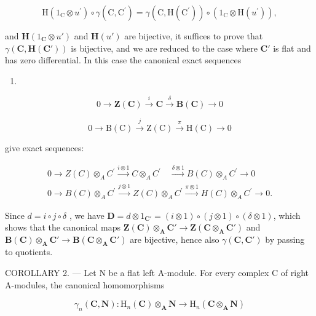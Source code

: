 \[
\mathrm{H} \left(1 _ {\mathrm{C}} \otimes u ^ {\prime}\right) \circ \gamma (\mathrm{C}, \mathrm{C} ^ {\prime}) = \gamma (\mathrm{C}, \mathrm{H} (\mathrm{C} ^ {\prime})) \circ \left(1 _ {\mathrm{C}} \otimes \mathrm{H} (u ^ {\prime})\right),
\]

and \(\mathbf{H}(1_{\mathbf{C}} \otimes u')\) and \(\mathbf{H}(u')\) are bijective, it suffices to prove that \(\gamma(\mathbf{C}, \mathbf{H}(\mathbf{C}'))\) is bijective, and we are reduced to the case where \(\mathbf{C}'\) is flat and has zero differential. In this case the canonical exact sequences

\begin{enumerate}
\def\labelenumi{(\Roman{enumi})}
\tightlist
\item
\end{enumerate}

\[
0 \to \mathbf {Z} (\mathbf {C}) \xrightarrow {i} \mathbf {C} \xrightarrow {\delta} \mathbf {B} (\mathbf {C}) \to 0\tag{II}
\]

\[
0 \rightarrow \mathrm{B} (\mathrm{C}) \xrightarrow {j} \mathrm{Z} (\mathrm{C}) \xrightarrow {\pi} \mathrm{H} (\mathrm{C}) \rightarrow 0
\]

give exact sequences:

\[
\begin{array}{l} 0 \longrightarrow Z (C) \otimes_ {A} C ^ {\prime} \xrightarrow {i \otimes 1} C \otimes_ {A} C ^ {\prime} \quad \xrightarrow {\delta \otimes 1} B (C) \otimes_ {A} C ^ {\prime} \longrightarrow 0 \\ 0 \longrightarrow B (C) \otimes_ {A} C ^ {\prime} \xrightarrow {j \otimes 1} Z (C) \otimes_ {A} C ^ {\prime} \xrightarrow {\pi \otimes 1} H (C) \otimes_ {A} C ^ {\prime} \longrightarrow 0. \end{array}
\]

Since \(d = i \circ j \circ \delta\) , we have \(\mathbf{D} = d \otimes 1_{\mathbf{C}'} = (i \otimes 1) \circ (j \otimes 1) \circ (\delta \otimes 1)\), which shows that the canonical maps \(\mathbf{Z}(\mathbf{C}) \otimes_{\mathbf{A}} \mathbf{C}' \to \mathbf{Z}(\mathbf{C} \otimes_{\mathbf{A}} \mathbf{C}')\) and \(\mathbf{B}(\mathbf{C}) \otimes_{\mathbf{A}} \mathbf{C}' \to \mathbf{B}(\mathbf{C} \otimes_{\mathbf{A}} \mathbf{C}')\) are bijective, hence also \(\gamma(\mathbf{C}, \mathbf{C}')\) by passing to quotients.

COROLLARY 2. --- Let N be a flat left A-module. For every complex C of right A-modules, the canonical homomorphisms

\[
\gamma_ {n} (\mathbf {C}, \mathbf {N}): \mathrm{H} _ {n} (\mathbf {C}) \otimes_ {\mathbf {A}} \mathbf {N} \rightarrow \mathrm{H} _ {n} (\mathbf {C} \otimes_ {\mathbf {A}} \mathbf {N})
\]

